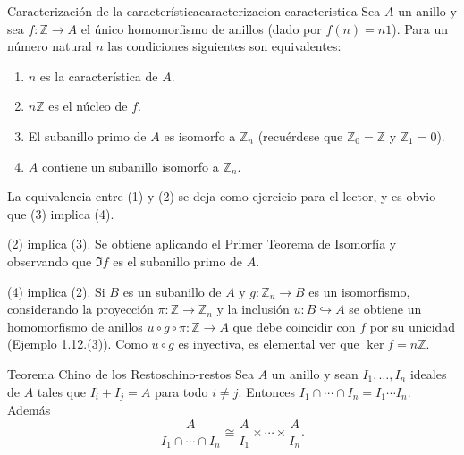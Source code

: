 \begin{proposition}{Caracterización de la característica}{caracterizacion-caracteristica}
Sea $A$ un anillo y sea $f : \mathbb{Z} \to A$ el único homomorfismo de anillos (dado por $f(n) = n1$). Para un número natural $n$ las condiciones siguientes son equivalentes:
\begin{enumerate}
    \item $n$ es la característica de $A$.
    \item $n\mathbb{Z}$ es el núcleo de $f$.
    \item El subanillo primo de $A$ es isomorfo a $\mathbb{Z}_n$ (recuérdese que $\mathbb{Z}_0 = \mathbb{Z}$ y $\mathbb{Z}_1 = 0$).
    \item $A$ contiene un subanillo isomorfo a $\mathbb{Z}_n$.
\end{enumerate}
\end{proposition}

\begin{proofbox}
La equivalencia entre (1) y (2) se deja como ejercicio para el lector, y es obvio que (3) implica (4).

(2) implica (3). Se obtiene aplicando el Primer Teorema de Isomorfía y observando que $\Im f$ es el subanillo primo de $A$.

(4) implica (2). Si $B$ es un subanillo de $A$ y $g : \mathbb{Z}_n \to B$ es un isomorfismo, considerando la proyección $\pi : \mathbb{Z} \to \mathbb{Z}_n$ y la inclusión $u : B \hookrightarrow A$ se obtiene un homomorfismo de anillos $u \circ g \circ \pi : \mathbb{Z} \to A$ que debe coincidir con $f$ por su unicidad (Ejemplo 1.12.(3)). Como $u \circ g$ es inyectiva, es elemental ver que $\ker f = n\mathbb{Z}$.
\end{proofbox}

\begin{theorem}{Teorema Chino de los Restos}{chino-restos}
Sea $A$ un anillo y sean $I_1, \ldots, I_n$ ideales de $A$ tales que $I_i + I_j = A$ para todo $i \neq j$. Entonces $I_1 \cap \cdots \cap I_n = I_1 \cdots I_n$. Además
\[
\frac{A}{I_1 \cap \cdots \cap I_n} \cong \frac{A}{I_1} \times \cdots \times \frac{A}{I_n}.
\]
\end{theorem}

